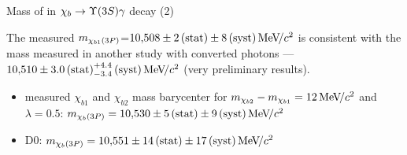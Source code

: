 \begin{frame}{Mass of \chiboneThreeP in $\chib \to \Y3S \gamma$ decay (2)}
\begin{center}
The measured $m_{\chi_{b 1}(3P)}$=\textcolor{red}{$10{,}508\pm2\mathrm{\,(stat)}\pm8\mathrm{\,(syst)}{\mathrm{\,Me\kern -0.1em V\!/}c^2}$} is consistent
with the mass measured in another study with converted photons ---
\textcolor{blue}{$10{,}510\pm3.0\mathrm{\,(stat)}^{+4.4}_{-3.4}\mathrm{\,(syst)}{\mathrm{\,Me\kern -0.1em V\!/}c^2}$} (very preliminary results).
\end{center}
\begin{itemize}
\item \atlas measured $\chi_{b1}$ and $\chi_{b2}$  mass barycenter for $m_{\chi_{b2}} - m_{\chi_{b1}}=12{\mathrm{\,Me\kern -0.1em V\!/}c^2}$ and $\lambda=0.5$:
\textcolor{blue}{$m_{\chi_{b}(3P)} = 10{,}530\pm5\mathrm{\,(stat)}\pm9\mathrm{\,(syst)}{\mathrm{\,Me\kern -0.1em V\!/}c^2}$}
\item D0: \textcolor{blue}{$m_{\chi_{b}(3P)} = 10{,}551\pm14\mathrm{\,(stat)}\pm17\mathrm{\,(syst)}{\mathrm{\,Me\kern -0.1em V\!/}c^2}$}
\end{itemize}
\end{frame}
